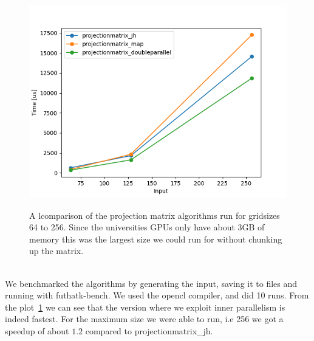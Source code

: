 \begin{figure}[h]
\includegraphics{images/resultsMatrixPlot.png}
\label{sysmatcompare}
  \caption{A lcomparison of the projection matrix algorithms run for gridsizes 64 to 256. Since the universities GPUs only have about 3GB of memory this was the largest size we could run for without chunking up the matrix.}
\end{figure}\\
We benchmarked the algorithms by generating the input, saving it to files and running with futhatk-bench. We used the opencl compiler, and did 10 runs. From the plot~\ref{sysmatcompare} we can see that the version where we exploit inner parallelism is indeed fastest. For the maximum size we were able to run, i.e 256 we got a speedup of about $1.2$ compared to projectionmatrix\_jh.
